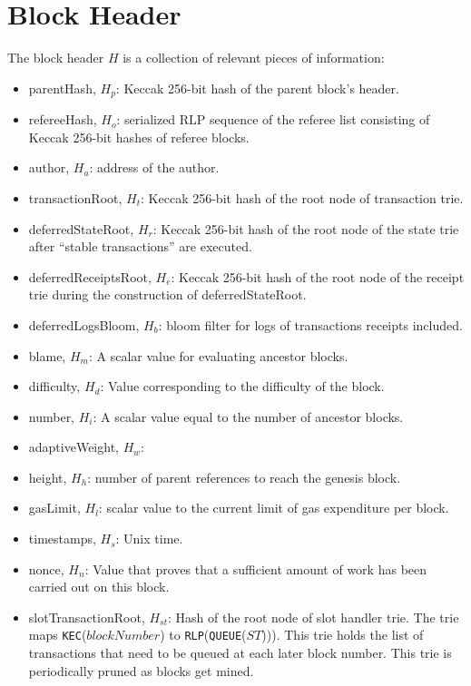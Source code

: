 \documentclass{article}
\begin{document}
\newpage
\section{Block Header}
The block header $H$ is a collection of relevant pieces of information:
\begin{itemize}
    \item parentHash, $H_p$: Keccak 256-bit hash of the parent block’s header.
    \item refereeHash, $H_o$: serialized RLP sequence of the referee list consisting of Keccak 256-bit hashes of referee blocks.
    \item author, $H_a$: address of the author.
    \item transactionRoot, $H_t$: Keccak 256-bit hash of the root node of transaction trie.
    \item deferredStateRoot, $H_r$: Keccak 256-bit hash of the root node of the state trie after “stable transactions” are executed.
    \item deferredReceiptsRoot, $H_e$: Keccak 256-bit hash of the root node of the receipt trie during the construction of deferredStateRoot.
    \item deferredLogsBloom, $H_b$: bloom filter for logs of transactions receipts included.
    \item blame, $H_m$: A scalar value for evaluating ancestor blocks.
    \item difficulty, $H_d$: Value corresponding to the difficulty of the block.
    \item number, $H_i$: A scalar value equal to the number of ancestor blocks.
    \item adaptiveWeight, $H_w$:
    \item height, $H_h$: number of parent references to reach the genesis block.
    \item gasLimit, $H_l$: scalar value to the current limit of gas expenditure per block.
    \item timestamps, $H_s$: Unix time.
    \item nonce, $H_n$: Value that proves that a sufficient amount of work has been carried out on this block.
    \item slotTransactionRoot, $H_{st}$: Hash of the root node of slot handler trie. The trie maps \texttt{KEC}($blockNumber$) to \texttt{RLP}(\texttt{QUEUE}($ST$))). This trie holds the list of transactions that need to be queued at each later block number. This trie is periodically pruned as blocks get mined.  
\end{itemize}
\end{document}
